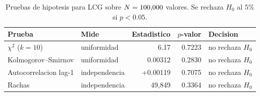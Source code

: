 \begin{table}[htbp]\centering
\caption{Pruebas de hipotesis para LCG sobre $N=100{,}000$ valores. Se rechaza $H_0$ al $5\%$ si $p<0.05$.}
\label{tab:pruebasLCG}
\small
\begin{tabular}{l|l|r|r|l}
\toprule
Prueba & Mide & Estadistico & $p$-valor & Decision \\
\midrule
$\chi^2$ ($k=10$) & uniformidad & 6.17 & 0.7223 & no rechaza $H_0$ \\
Kolmogorov--Smirnov & uniformidad & 0.00312 & 0.2830 & no rechaza $H_0$ \\
Autocorrelacion lag-1 & independencia & +0.00119 & 0.7075 & no rechaza $H_0$ \\
Rachas & independencia & 49{,}849 & 0.3364 & no rechaza $H_0$ \\
\bottomrule
\end{tabular}
\end{table}
